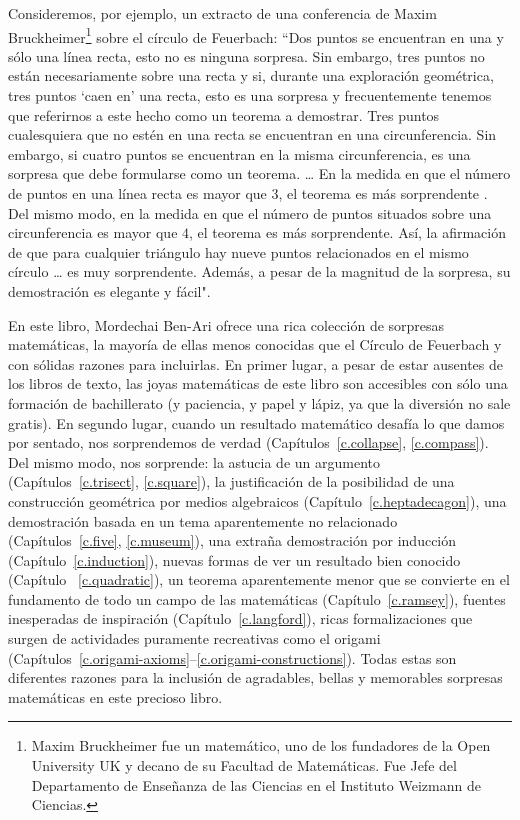 Consideremos, por ejemplo, un extracto de una conferencia de Maxim Bruckheimer\footnote{Maxim Bruckheimer fue un matemático, uno de los fundadores de la Open University UK y decano de su Facultad de Matemáticas. Fue Jefe del Departamento de Enseñanza de las Ciencias en el Instituto Weizmann de Ciencias.} sobre el círculo de Feuerbach: ``Dos puntos se encuentran en una y sólo una línea recta, esto no es ninguna sorpresa. Sin embargo, tres puntos no están necesariamente sobre una recta y si, durante una exploración geométrica, tres puntos `caen en' una recta, esto es una sorpresa y frecuentemente tenemos que referirnos a este hecho como un teorema a demostrar. Tres puntos cualesquiera que no estén en una recta se encuentran en una circunferencia. Sin embargo, si cuatro puntos se encuentran en la misma circunferencia, es una sorpresa que debe formularse como un teorema. \ldots{} En la medida en que el número de puntos en una línea recta es mayor que $3$, el teorema es más sorprendente . Del mismo modo, en la medida en que el número de puntos situados sobre una circunferencia es mayor que $4$, el teorema es más sorprendente. Así, la afirmación de que para cualquier triángulo hay nueve puntos relacionados en el mismo círculo \ldots{} es muy sorprendente. Además, a pesar de la magnitud de la sorpresa, su demostración es elegante y fácil".

En este libro, Mordechai Ben-Ari ofrece una rica colección de sorpresas matemáticas, la mayoría de ellas menos conocidas que el Círculo de Feuerbach y con sólidas razones para incluirlas. En primer lugar, a pesar de estar ausentes de los libros de texto, las joyas matemáticas de este libro son accesibles con sólo una formación de bachillerato (y paciencia, y papel y lápiz, ya que la diversión no sale gratis). En segundo lugar, cuando un resultado matemático desafía lo que damos por sentado, nos sorprendemos de verdad (Capítulos~\ref{c.collapse}, \ref{c.compass}). Del mismo modo, nos sorprende: la astucia de un argumento (Capítulos~\ref{c.trisect}, \ref{c.square}), la justificación de la posibilidad de una construcción geométrica por medios algebraicos (Capítulo~\ref{c.heptadecagon}), una demostración basada en un tema aparentemente no relacionado (Capítulos~\ref{c.five}, \ref{c.museum}), una extraña demostración por inducción (Capítulo~\ref{c.induction}), nuevas formas de ver un resultado bien conocido (Capítulo ~\ref{c.quadratic}), un teorema aparentemente menor que se convierte en el fundamento de todo un campo de las matemáticas (Capítulo~\ref{c.ramsey}), fuentes inesperadas de inspiración (Capítulo~\ref{c.langford}), ricas formalizaciones que surgen de actividades puramente recreativas como el origami (Capítulos~\ref{c.origami-axioms}--\ref{c.origami-constructions}). Todas estas son diferentes razones para la inclusión de agradables, bellas y memorables sorpresas matemáticas en este precioso libro.
   
